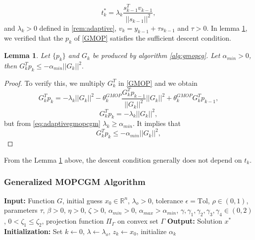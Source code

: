 \documentclass{article}
\newtheorem{lemma}{Lemma}
\theoremstyle{remark}
\begin{document}
{\begin{equation}
    \label{eq:optimaltmop}
    t_k^*=\lambda_k \frac{s_{k-1}^Tv_{k-1}}{||s_{k-1}||^2},
\end{equation} and
 $\lambda_k > 0$ defined in \eqref{rem:adaptive}, $v_k=y_{k-1}+\tau s_{k-1}$ and $\tau>0$. In lemma \ref{lemm1:gmopcgm}, we verified that the $p_k$ of \eqref{GMOP} satisfies the sufficient descent condition.
\begin{lemma}
\label{lemm1:gmopcgm}
Let $\{p_k\}$ and $G_k$ be produced by algorithm \ref{alg:gmopcg}. Let $\alpha_{min} > 0$, then  $G_k^Tp_k\leq-\alpha_{min}  ||G_k||^2.$ 
\end{lemma}
\begin{proof}
    To verify this, we multiply $G_k^T$ in \eqref{GMOP} and we obtain
\[
G_k^Tp_k=-\lambda_k ||G_k||^2-\theta_k^{GMOP}\frac{G_k^Tp_{k-1}}{||G_k||^2}||G_k||^2+\theta_k^{GMOP}G_k^Tp_{k-1},
\]
\[
G_k^Tp_k=-\lambda_k ||G_k||^2, 
\]
but from \eqref{eq:adaptivegmopcgm} $\lambda_k\geq \alpha_{min}$. It implies that 
\begin{equation}
\label{eq:sufficientdescentmop}
G_k^Tp_k\leq -\alpha_{min} ||G_k||^2, 
\end{equation}
\end{proof}



From the Lemma \ref{lemm1:gmopcgm} above, the descent condition generally does not depend on $t_k$.



\newpage
\subsubsection{Generalized MOPCGM Algorithm}
\renewcommand{\baselinestretch}{0.95}
\begin{algorithm}[H]
    \caption{Generalized MOPCGM}
    \label{alg:gmopcg}
    \begin{algorithmic}[1]
        \State \textbf{Input:} Function $G$, initial guess $x_0 \in \mathbb{R}^n$, 
        $\lambda_o > 0$, tolerance $\epsilon = \text{Tol}$, 
        $\rho \in (0, 1)$, parameters $\tau$,   
        $\beta > 0$, $\eta > 0$, $\zeta > 0$, $\alpha_{min}> 0$, $\alpha_{max}> \alpha_{min}$, $\gamma, \gamma_1, \gamma_2, \gamma_3, \gamma_4 \in (0, 2) $, $0<\zeta_1\leq \zeta_2$, projection function 
        $\Pi_{\Gamma}$ on convex set $\Gamma$
        \State \textbf{Output:} Solution $x^*$
        \State \textbf{Initialization:} Set $k \gets 0$, $\lambda \gets \lambda_o$, $z_k \gets x_0$, initialize $\alpha_k$
        

\end{algorithmic}
\end{algorithm}}
\end{document}
